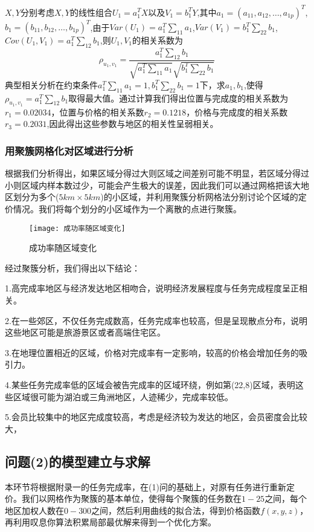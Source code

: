 \documentclass{ctexart}
\begin{document}
$X,Y$分别考虑$X,Y$的线性组合$U_1=a^{T}_{1}X$以及$V_1=b^{T}_{1}Y$,其中$a_1=(a_{11},a_{12},\dots,a_{1p})^T$,$b_1=(b_{11},b_{12},\dots,b_{1p})^T$,由于$Var(U_1)=a_{1}^{T}\sum_{11} a_1$,$Var(V_1)=b_{1}^{T}\sum_{22} b_1$,$Cov(U_1,V_1)=a_{1}^{T}\sum_{12} b_1$,则$U_1,V_1$的相关系数为$$\rho_{u_1,v_1}=\frac{a_{1}^{T}\sum_{12} b_1}{\sqrt{a_{1}^{T}\sum_{11} a_1} \sqrt{b_{1}^{T}\sum_{22} b_1}}$$
典型相关分析在约束条件$a_{1}^{T}\sum_{11} a_1=1,b_{1}^{T}\sum_{22} b_1=1$下，求$a_1,b_1$,使得
$\rho_{u_1,v_1}={a_{1}^{T}\sum_{12} b_1}$取得最大值。通过计算我们得出位置与完成度的相关系数为$r_1=0.02034$，位置与价格的相关系数$r_2=0.1218$，价格与完成度的相关系数$r_3=0.2031$,因此得出这些参数与地区的相关性呈弱相关。
\subsubsection{用聚簇网格化对区域进行分析}
根据我们分析得出，如果区域分得过大则区域之间差别可能不明显，若区域分得过小则区域内样本数过少，可能会产生极大的误差，因此我们可以通过网格把该大地区划分为多个($5km\times5km$)的小区域，并利用聚簇分析网格法分别讨论个区域的定价情况。我们将每个划分的小区域作为一个离散的点进行聚簇。


\begin{figure}[htbp] 
\centering
\texttt{[image: 成功率随区域变化]} 
\caption{成功率随区域变化}
\end{figure}
\newpage
经过聚簇分析，我们得出以下结论：

1.高完成率地区与经济发达地区相吻合，说明经济发展程度与任务完成程度呈正相关。

2.在一些郊区，不仅任务完成数高，任务完成率也较高，但是呈现散点分布，说明这些地区可能是旅游景区或者高端住宅区。

3.在地理位置相近的区域，价格对完成率有一定影响，较高的价格会增加任务的吸引力。

4.某些任务完成率低的区域会被告完成率的区域环绕，例如第(22,8)区域，表明这些区域很可能为湖泊或三角洲地区，人迹稀少，完成率较低。

5.会员比较集中的地区完成度较高，考虑是经济较为发达的地区，会员密度会比较大，


\subsection{问题(2)的模型建立与求解}
本环节将根据附录一的任务完成率，在(1)问的基础上，对原有任务进行重新定价。我们以网格作为聚簇的基本单位，使得每个聚簇的任务数在$1-25$之间，每个地区加权人数在$0-300$之间，然后利用曲线的拟合法，得到价格函数$f(x,y,z)$，再利用叹息你算法积累局部最优解来得到一个优化方案。
\end{document}
